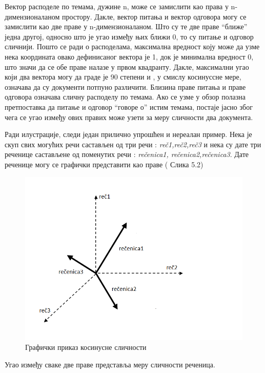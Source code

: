 Вектор расподеле по темама, дужине n, може се замислити  као права у n-димензионаланом простору. Дакле, вектор питања и вектор одговора могу се замислити као две праве у n-димензионаланом. Што су те две праве "`ближе"' једна другој, односно што је угао између њих ближи 0, то су питање и одговор сличнији. 
Пошто се ради о расподелама, максимална вредност коју може да узме нека координата овако дефинисаног вектора је 1, док је минимална вредност 0, што значи да се обе праве налазе у првом квадранту. Дакле, максимални угао који два вектора могу да граде је 90 степени и , у смислу косинуссне мере, означава да су документи потпуно различити.
Близина праве питања и праве одговора означава сличну расподелу по темама. Ако се узме у обзор полазна претпоставка да питање и одговор "`говоре о"' истим темама, постаје јасно због чега се угао између ових правих може узети за меру сличности два документа.

Ради илустрације, следи један прилично упрошћен и нереалан пример. 
Нека је скуп свих могућих речи састављен од три речи : \textit{reč1,reč2,reč3} и нека су дате три реченице састављене од поменутих речи : \textit{rečenica1, rečenica2,rečenica3}. 
Дате реченице могу се графички представити као праве ( Слика 5.2)

\begin{figure}[H]
    \centering
   \includegraphics[scale=0.3]{./Slike/kosinusna.png} 
	\caption{Графички приказ косинусне сличности}
	\label{fig:slika1}
\end{figure}

Угао између сваке две праве представља меру сличности реченица.

